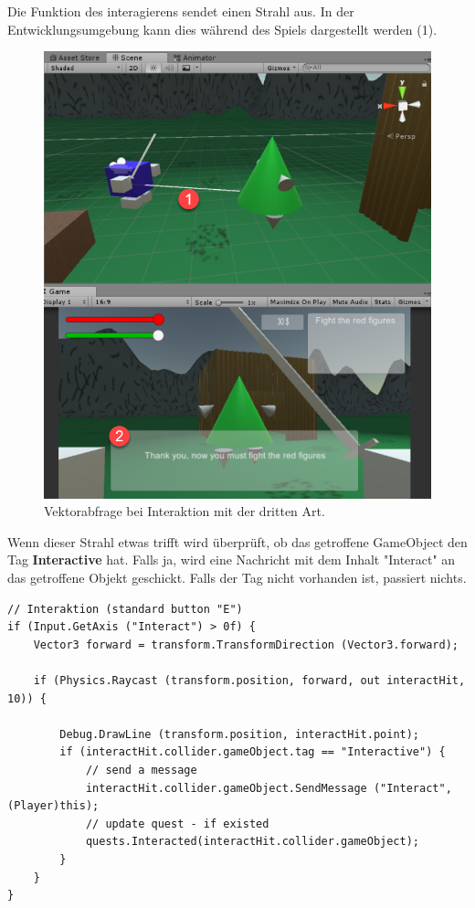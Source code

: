 Die Funktion des interagierens sendet einen Strahl aus. In der Entwicklungsumgebung kann dies während des Spiels dargestellt werden (1).

\begin{figure}[H]
\includegraphics[scale=0.5]{screenshots/raycastthirdkind.png}
\caption{Vektorabfrage bei Interaktion mit der dritten Art.}
\end{figure}

Wenn dieser Strahl etwas trifft wird überprüft, ob das getroffene GameObject den Tag \textbf{Interactive} hat. Falls ja, wird eine Nachricht mit dem Inhalt "Interact" an das getroffene Objekt geschickt. Falls der Tag nicht vorhanden ist, passiert nichts.

\begin{lstlisting}[caption={Auslösen der Interaktion}]
// Interaktion (standard button "E")
if (Input.GetAxis ("Interact") > 0f) {
	Vector3 forward = transform.TransformDirection (Vector3.forward);

	if (Physics.Raycast (transform.position, forward, out interactHit, 10)) {	
		
		Debug.DrawLine (transform.position, interactHit.point);
		if (interactHit.collider.gameObject.tag == "Interactive") {
			// send a message
			interactHit.collider.gameObject.SendMessage ("Interact", (Player)this);
			// update quest - if existed
			quests.Interacted(interactHit.collider.gameObject);
		}
	}	
}
\end{lstlisting}

